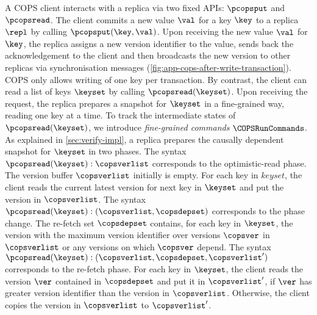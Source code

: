 A COPS client interacts with a replica via two fixed APIs: \( \pcopsput \) and \( \pcopsread \).
The client commits a new value \( \val \) for a key \( \key \) to a replica \( \repl \) by calling  \( \pcopsput(\key,\val) \).
Upon receiving the new value  \( \val \) for \( \key \),
the replica assigns a new version identifier to the value, sends back the acknowledgement to the client
and then broadcasts the new version to other replicas via synchronisation messages (\cref{fig:app-cops-after-write-transaction}).
COPS only allows writing of one key per transaction.
By contrast, the client can read a list of keys \( \keyset \) by calling \( \pcopsread(\keyset) \).
Upon receiving the request,
the replica prepares a snapshot for \( \keyset \) in a fine-grained way, reading one key at a time.
To track the intermediate states of \(\pcopsread(\keyset)\), 
we introduce \emph{fine-grained commands} \( \COPSRunCommands \).
As explained in \cref{sec:verify-impl},
a replica prepares the causally dependent snapshot for \( \keyset \) in two phases.
The syntax \( \pcopsread(\keyset) : \copsverlist \) corresponds to the optimistic-read phase.
The version buffer \(  \copsverlist \) initially is empty.
For each key in \( keyset \), 
the client reads the current latest version for next key in \( \keyset \) 
and put the version in \( \copsverlist \).
The syntax \( \pcopsread(\keyset) : (\copsverlist,\copsdepset) \) corresponds to the phase change.
The re-fetch set \( \copsdepset \) contains, for each key in \( \keyset \), 
the version with the maximum version identifier over versions \( \copsver \) in \( \copsverlist \) 
or any versions on which \( \copsver \) depend.
The syntax \( \pcopsread(\keyset) : (\copsverlist,\copsdepset,\copsverlist') \) corresponds to the re-fetch phase.
For each key in \( \keyset \), 
the client reads the version \( \ver \) contained in \( \copsdepset \) and put it in \( \copsverlist' \),
if \( \ver \) has greater version identifier than the version in \( \copsverlist \).
Otherwise, the client copies the version in \( \copsverlist \) to \( \copsverlist' \).


